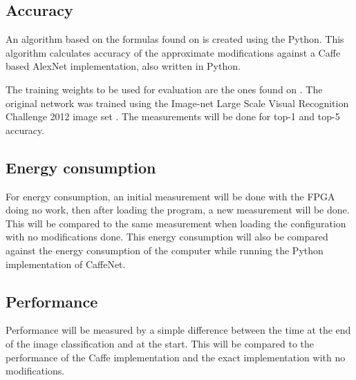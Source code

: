 \subsection{Accuracy}

An algorithm based on the formulas found on \cite{googledev} is created using the Python. This algorithm
calculates accuracy of the approximate modifications against a Caffe \cite{jia2014caffe} based AlexNet implementation,
also written in Python.

The training weights to be used for evaluation are the ones found on \cite{donahue2012bvlc}. The original network
was trained using the Image-net Large Scale Visual Recognition Challenge 2012 image set \cite{lsvrc}.
The measurements will be done for top-1 and top-5 accuracy.

\subsection{Energy consumption}

For energy consumption, an initial measurement will be done with the FPGA doing no work, then after loading the program,
a new measurement will be done. This will be compared to the same measurement when loading the configuration with no
modifications done. This energy consumption will also be compared against the energy consumption of the computer
while running the Python implementation of CaffeNet.

\subsection{Performance}

Performance will be measured by a simple difference between the time 
at the end of the image classification and at the start.
This will be compared to the performance of the Caffe implementation 
and the exact implementation with no modifications.